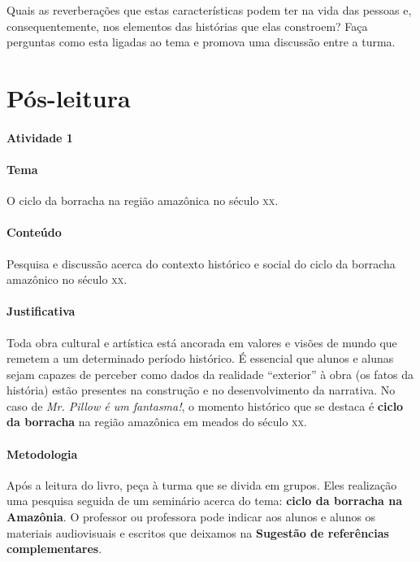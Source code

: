\documentclass[11pt]{extarticle}
\begin{document}
Quais as reverberações que estas características podem ter na vida das pessoas e, 
consequentemente, nos elementos das histórias que elas constroem? 
Faça perguntas como esta ligadas ao tema e promova uma discussão entre a turma.  


\section{Pós-leitura}


\paragraph{Atividade 1} 

\paragraph{Tema} O ciclo da borracha na região amazônica no século \textsc{xx}.

\paragraph{Conteúdo}Pesquisa e discussão acerca do contexto histórico e social 
do ciclo da borracha amazônico no século \textsc{xx}.

\paragraph{Justificativa} Toda obra cultural e artística está ancorada em valores e 
visões de mundo que remetem a um determinado período histórico. 
É essencial que alunos e alunas sejam capazes de perceber como 
dados da realidade ``exterior'' à obra (os fatos da história) estão
presentes na construção e no desenvolvimento da narrativa. No caso 
de \textit{Mr. Pillow é um fantasma!}, o momento histórico que se 
destaca é \textbf{ciclo da borracha} na região amazônica em meados
do século \textsc{xx}.

\paragraph{Metodologia} Após a leitura do livro, peça à turma que se divida em grupos.
Eles realização uma pesquisa seguida de um seminário acerca do tema: \textbf{ciclo da borracha na Amazônia}.
O professor ou professora pode indicar aos alunos e alunos os materiais 
audiovisuais e escritos que deixamos na \textbf{Sugestão de referências complementares}.
\end{document}
